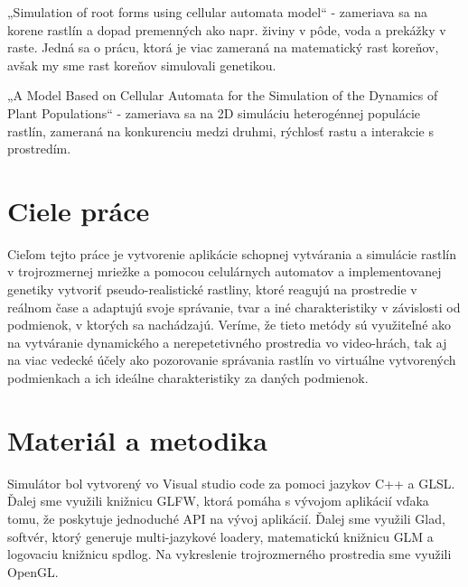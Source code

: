 \documentclass[12pt]{article}
\begin{document}
„Simulation of root forms using cellular automata model“ - zameriava sa na
korene rastlín a dopad premenných ako napr. živiny v pôde, voda a prekážky
v raste. Jedná sa o prácu, ktorá je viac zameraná na matematický rast koreňov,
avšak my sme rast koreňov simulovali genetikou.

„A Model Based on Cellular Automata for the Simulation of the Dynamics of
Plant Populations“ - zameriava sa na 2D simuláciu heterogénnej populácie
rastlín, zameraná na konkurenciu medzi druhmi, rýchlosť rastu a interakcie
s prostredím.

\section{Ciele práce} %

Cieľom tejto práce je vytvorenie aplikácie schopnej vytvárania a simulácie
rastlín v trojrozmernej mriežke a pomocou celulárnych automatov
a implementovanej genetiky vytvoriť pseudo-realistické rastliny, ktoré reagujú
na prostredie v reálnom čase a adaptujú svoje správanie, tvar a iné
charakteristiky v závislosti od podmienok, v ktorých sa nachádzajú. Veríme,
že tieto metódy sú využiteľné ako na vytváranie dynamického a nerepetetivného
prostredia vo video-hrách, tak aj na viac vedecké účely ako pozorovanie
správania rastlín vo virtuálne vytvorených podmienkach a ich ideálne
charakteristiky za daných podmienok.

\section{Materiál a metodika}

Simulátor %
bol vytvorený vo Visual studio code za pomoci jazykov C++ a GLSL.
Ďalej sme využili knižnicu GLFW, ktorá pomáha s vývojom aplikácií vďaka tomu,
že poskytuje jednoduché API na vývoj aplikácií. Ďalej sme využili Glad,
softvér, ktorý generuje multi-jazykové loadery, matematickú knižnicu GLM
a logovaciu knižnicu spdlog. Na vykreslenie trojrozmerného prostredia sme
využili OpenGL.
\end{document}
